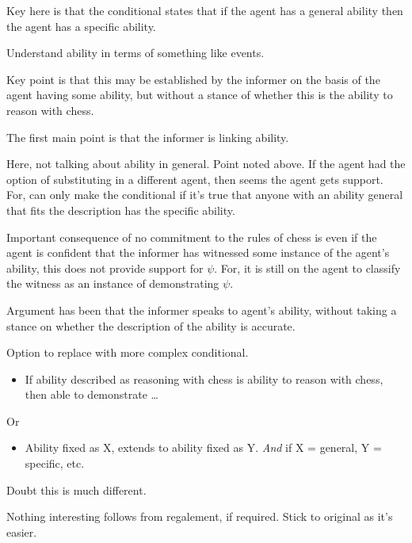 \documentclass[10pt]{article}
\begin{document}
\begin{note}
  Key here is that the conditional states that if the agent has a general ability then the agent has a specific ability.

  Understand ability in terms of something like events.

  Key point is that this may be established by the informer on the basis of the agent having some ability, but without a stance of whether this is the ability to reason with chess.
\end{note}

\begin{note}
  The first main point is that the informer is linking ability.
\end{note}

\begin{note}
  Here, not talking about ability in general.
  Point noted above.
  If the agent had the option of substituting in a different agent, then seems the agent gets support.
  For, can only make the conditional if it's true that anyone with an ability general that fits the description has the specific ability.
\end{note}

\begin{note}
  Important consequence of no commitment to the rules of chess is even if the agent is confident that the informer has witnessed some instance of the agent's ability, this does not provide support for \(\psi\).
  For, it is still on the agent to classify the witness as an instance of demonstrating \(\psi\).
\end{note}

\begin{note}
  Argument has been that the informer speaks to agent's ability, without taking a stance on whether the description of the ability is accurate.

   Option to replace with more complex conditional.

  \begin{itemize}
  \item If ability described as reasoning with chess is ability to reason with chess, then able to demonstrate \dots
  \end{itemize}
  Or
  \begin{itemize}
  \item Ability fixed as X, extends to ability fixed as Y. \emph{And} if X = general, Y = specific, etc.
  \end{itemize}
  Doubt this is much different.

  Nothing interesting follows from regalement, if required.
  Stick to original as it's easier.
\end{note}
\end{document}
